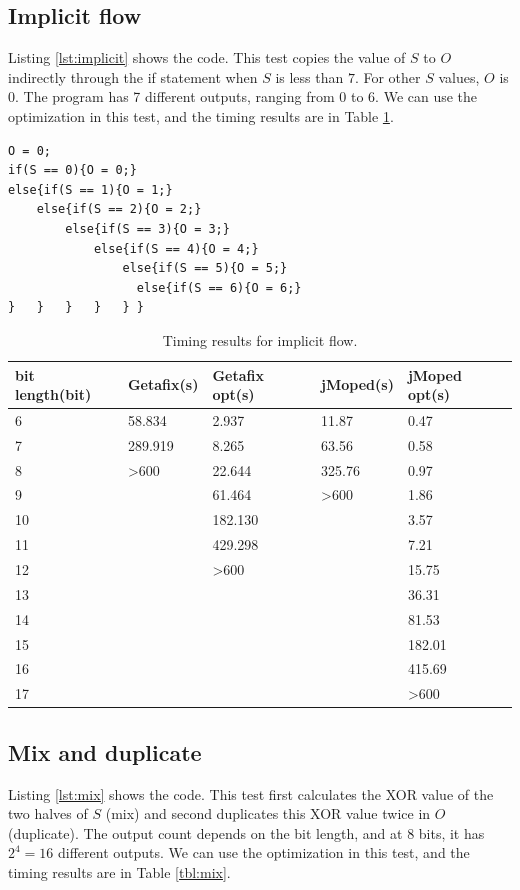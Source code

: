 \subsection{Implicit flow}
Listing \ref{lst:implicit} shows the code. This test copies the value of $S$ to $O$ indirectly through the if statement when $S$ is less than $7$. For other $S$ values, $O$ is $0$. The program has 7 different outputs, ranging from $0$ to $6$. We can use the optimization in this test, and the timing results are in Table \ref{tbl:implicit}.

\lstset{language=C}  
\begin{lstlisting}[float=!h, caption={Implict flow test program.},label=lst:implicit]
O = 0;
if(S == 0){O = 0;}
else{if(S == 1){O = 1;}
	else{if(S == 2){O = 2;}
		else{if(S == 3){O = 3;}
			else{if(S == 4){O = 4;}
				else{if(S == 5){O = 5;}
				  else{if(S == 6){O = 6;}
}	}	}	} 	} }
\end{lstlisting}

\begin{table}[!h]
\begin{center}
\begin{tabular}{|l|l|l|l|l|}
\hline
bit length(bit) & Getafix(s) & Getafix opt(s) & jMoped(s) & jMoped opt(s) \\ \hline
6 & 58.834 & 2.937 & 11.87 & 0.47 \\ \hline
7 & 289.919 & 8.265 & 63.56 & 0.58 \\ \hline
8 & \textgreater600 & 22.644 & 325.76 & 0.97 \\ \hline
9 &  & 61.464 & \textgreater600 & 1.86 \\ \hline
10 &  & 182.130 &  & 3.57 \\ \hline
11 &  & 429.298 &  & 7.21 \\ \hline
12 &  & \textgreater600 &  & 15.75 \\ \hline
13 &  &  &  & 36.31 \\ \hline
14 &  &  &  & 81.53 \\ \hline
15 &  &  &  & 182.01 \\ \hline
16 &  &  &  & 415.69 \\ \hline
17 &  &  &  & \textgreater600 \\ \hline
\end{tabular}
\end{center}
\caption{Timing results for implicit flow.}
\label{tbl:implicit}
\end{table}

\subsection{Mix and duplicate}
Listing \ref{lst:mix} shows the code. This test first calculates the XOR value of the two halves of $S$ (mix) and second duplicates this XOR value twice in $O$ (duplicate). The output count depends on the bit length, and at $8$ bits, it has $2^{4} = 16$ different outputs. We can use the optimization in this test, and the timing results are in Table \ref{tbl:mix}.

